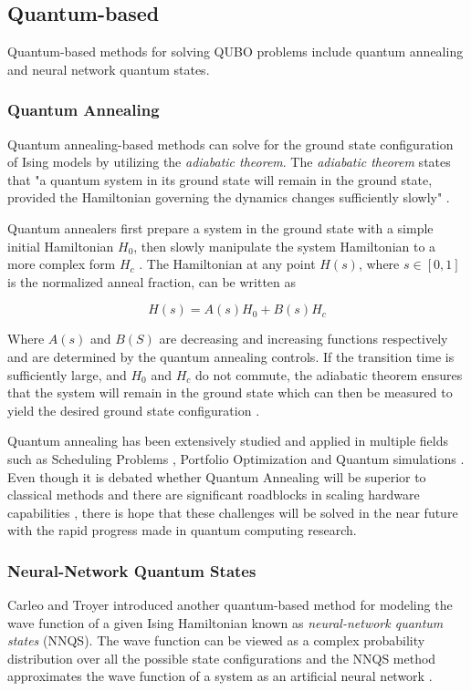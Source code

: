\subsection{Quantum-based}
Quantum-based methods for solving QUBO problems include quantum annealing and neural network quantum states.

\subsubsection{Quantum Annealing}
Quantum annealing-based methods can solve for the ground state configuration of Ising models by utilizing the \textit{adiabatic theorem}\cite{b14}. The \textit{adiabatic theorem} states that "a quantum system in its ground state will remain in the ground state, provided the Hamiltonian governing the dynamics changes sufficiently slowly" \cite{b14,b15}.

Quantum annealers first prepare a system in the ground state with a simple initial Hamiltonian $H_0$, then slowly manipulate the system Hamiltonian to a more complex form $H_c$ \cite{b10}. The Hamiltonian at any point $H(s)$, where $s \in [0,1]$ is the normalized anneal fraction, can be written as

\begin{equation}
    \label{eqn:annealinghamiltonian}
    H(s) = A(s)H_0 + B(s)H_c
\end{equation}

Where $A(s)$ and $B(S)$ are decreasing and increasing functions respectively and are determined by the quantum annealing controls. If the transition time is sufficiently large, and $H_0$ and $H_c$ do not commute, the adiabatic theorem ensures that the system will remain in the ground state which can then be measured to yield the desired ground state configuration \cite{b14}.

Quantum annealing has been extensively studied and applied in multiple fields such as Scheduling Problems \cite{b17}, Portfolio Optimization \cite{b18} and Quantum simulations \cite{b19}. Even though it is debated whether Quantum Annealing will be superior to classical methods \cite{b10} and there are significant roadblocks in scaling hardware capabilities \cite{b14}, there is hope that these challenges will be solved in the near future with the rapid progress made in quantum computing research.

\subsubsection{Neural-Network Quantum States}
Carleo and Troyer \cite{b20} introduced another quantum-based method for modeling the wave function of a given Ising Hamiltonian known as \textit{neural-network quantum states} (NNQS). The wave function can be viewed as a complex probability distribution over all the possible state configurations and the NNQS method approximates the wave function of a system as an artificial neural network \cite{b25}. 

